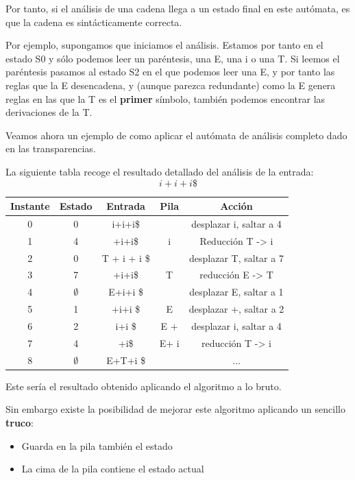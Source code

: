 \documentclass{apuntes}
\begin{document}
\begin{example}
Por tanto, si el análisis de una cadena llega a un estado final en este autómata, es que la cadena es sintácticamente correcta.

Por ejemplo, supongamos que iniciamos el análisis. Estamos por tanto en el estado S0 y sólo podemos leer un paréntesis, una E, una i o una T. Si leemos el paréntesis pasamos al estado S2 en el que podemos leer una E, y por tanto las reglas que la E desencadena, y (aunque parezca redundante) como la E genera reglas en las que la T es el \textbf{primer} símbolo, también podemos encontrar las derivaciones de la T.

\end{example}


Veamos ahora un ejemplo de como aplicar el autómata de análisis completo dado en las transparencias.
\begin{example}
La siguiente tabla recoge el resultado detallado del análisis de la entrada:
\[i+i+i\$\]
\begin{tabular}{| c | c | c | c | c |}
\hline
Instante & Estado  & Entrada & Pila & Acción \\
\hline
0 & 0 & i+i+i\$ & & desplazar i, saltar a 4\\
\hline
1 & 4 & +i+i\$ & i & Reducción T -> i \\
\hline
2 & 0 & T + i + i \$ & & desplazar T, saltar a 7 \\
\hline
3 & 7 & +i+i\$ & T & reducción E -> T\\
\hline
4 & $\emptyset$ & E+i+i \$ & & desplazar E, saltar a 1 \\
\hline
5 & 1 & +i+i \$ & E & desplazar +, saltar a 2\\
\hline
6 & 2 & i+i \$ & E + & desplazar i, saltar a 4\\
\hline
7 & 4 & +i\$ & E+ i & reducción T -> i \\
\hline
8 & $\emptyset$ & E+T+i \$ & & ... \\
\hline
\end{tabular}
\end{example}

Este sería el resultado obtenido aplicando el algoritmo a lo bruto.

Sin embargo existe la posibilidad de mejorar este algoritmo aplicando un sencillo \textbf{truco}:
\begin{itemize}
\item Guarda en la pila también el estado
\item La cima de la pila contiene el estado actual
\end{itemize}
\end{document}
